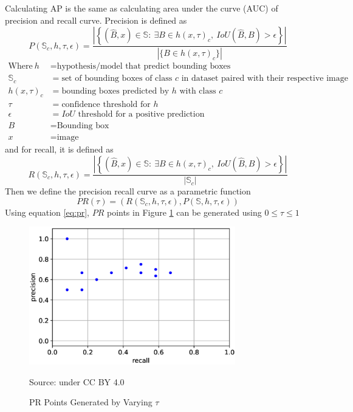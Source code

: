   Calculating AP is the same as calculating area under the curve (AUC) of precision and recall curve.
  Precision is defined as
  \begin{equation}
    P(\mathbb{S}_c,h,\tau,\epsilon) = \dfrac{\left|\left\{(\hat{B},x) \in \mathbb{S} :\ \exists B \in h(x,\tau)_c,\ IoU(\hat{B},B) > \epsilon  \right\}\right|}{\left| \{B \in h(x,\tau)_c\} \right|}
    \label{eq:precision}
  \end{equation}
  \begin{align*}
    \text{Where}~ h &=  \text{hypothesis/model that predict bounding boxes}\\%
    \mathbb{S}_c &= \text{set of bounding boxes of class $c$ in dataset paired with their respective image}\\
    h(x,\tau)_c &= \text{bounding boxes predicted by $h$ with class $c$}\\
    \tau &= \text{confidence threshold for $h$} \\
    \epsilon &= \text{$IoU$ threshold for a positive prediction}\\
    B &= \text{Bounding box}\\
    x &= \text{image}
  \end{align*}
  and for recall, it is defined as
  \begin{equation}
    R(\mathbb{S}_c,h,\tau,\epsilon) = \dfrac{\left|\left\{(\hat{B},x) \in \mathbb{S} :\ \exists B \in h(x,\tau)_c,\ IoU(\hat{B},B) > \epsilon  \right\}\right|}{\left| \mathbb{S}_c \right|}
    \label{eq:recall}
  \end{equation}
  Then we define the precision recall curve as a parametric function
  \begin{equation}
    PR(\tau) = \left( R(\mathbb{S}_c,h,\tau,\epsilon),P(\mathbb{S},h,\tau,\epsilon) \right)
    \label{eq:pr}
  \end{equation}
  Using equation \ref{eq:pr}, $PR$ points in Figure \ref{fig:pr-curve} can be generated using $0 \leq \tau \leq 1$
  \begin{figure}[p]
        \centering
        \includegraphics[width=0.8\textwidth]{figures/pr-curve.png}
        \vspace{-1ex}
        \caption*{Source: \textcite{map-hui} under CC BY 4.0}
        \vspace{-1ex}
        \caption{PR Points Generated by Varying $\tau$}
        \label{fig:pr-curve}
  \end{figure}
